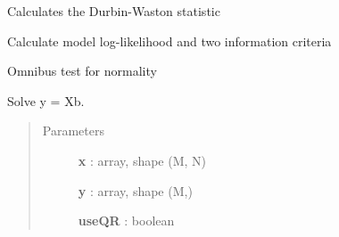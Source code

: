 \documentclass[letterpaper,10pt,english]{sphinxmanual}
\begin{document}
\begin{fulllineitems}
\begin{fulllineitems}
\end{fulllineitems}


\begin{fulllineitems}
\label{qikify.controllers:qikify.controllers.OLS.OLS.computeStatistics}
\end{fulllineitems}


\begin{fulllineitems}
\label{qikify.controllers:qikify.controllers.OLS.OLS.dw}
Calculates the Durbin-Waston statistic

\end{fulllineitems}


\begin{fulllineitems}
\label{qikify.controllers:qikify.controllers.OLS.OLS.ll}
Calculate model log-likelihood and two information criteria

\end{fulllineitems}


\begin{fulllineitems}
\label{qikify.controllers:qikify.controllers.OLS.OLS.omni}
Omnibus test for normality

\end{fulllineitems}


\begin{fulllineitems}
\label{qikify.controllers:qikify.controllers.OLS.OLS.train}
Solve y = Xb.
\begin{quote}\begin{description}
\item[{Parameters }] \leavevmode
\textbf{x} : array, shape (M, N)

\textbf{y} : array, shape (M,)

\textbf{useQR} : boolean
\begin{quote}


\end{quote}
\end{description}
\end{quote}
\end{fulllineitems}
\end{fulllineitems}
\end{document}
